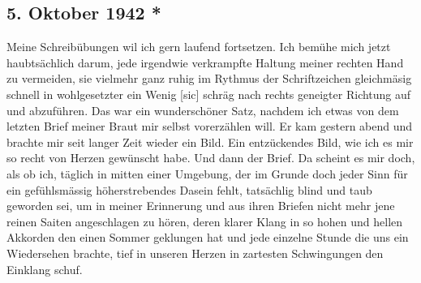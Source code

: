 \subsection{5. Oktober 1942 *}

Meine Schreib\"{u}bungen wil ich gern laufend fortsetzen.
Ich bem\"{u}he mich jetzt haubts\"{a}chlich darum, jede irgendwie verkrampfte Haltung meiner rechten Hand zu vermeiden, sie vielmehr ganz ruhig im Rythmus der Schriftzeichen gleichm\"{a}sig schnell in wohlgesetzter ein Wenig{\color{red} [sic] } schr\"{a}g nach rechts geneigter Richtung auf und abzuf\"{u}hren.
Das war ein wundersch\"{o}ner Satz, nachdem ich etwas von dem letzten Brief meiner Braut mir selbst vorerz\"{a}hlen will.
Er kam gestern abend und brachte mir seit langer Zeit wieder ein Bild.
Ein entz\"{u}ckendes Bild, wie ich es mir so recht von Herzen gew\"{u}nscht habe.
Und dann der Brief.
Da scheint es mir doch, als ob ich, t\"{a}glich in mitten einer Umgebung, der im Grunde doch jeder Sinn f\"{u}r ein gef\"{u}hlsm\"{a}ssig h\"{o}herstrebendes Dasein fehlt, tats\"{a}chlig blind und taub geworden sei, um in meiner Erinnerung und aus ihren Briefen nicht mehr jene reinen Saiten angeschlagen zu h\"{o}ren, deren klarer Klang in so hohen und hellen Akkorden den einen Sommer geklungen hat und jede einzelne Stunde die uns ein Wiedersehen brachte, tief in unseren Herzen in zartesten Schwingungen den Einklang schuf.

\clearpage
